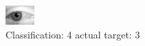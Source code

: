 \begin{figure}[h!]
\begin{center}
\includegraphics[width=0.60\columnwidth]{figures/ID2853_class_4_target_3.png}
\end{center}
\caption{ Classification: 4 actual target: 3}
\label{fig:ID2853_class_4_target_3}
\end{figure}
